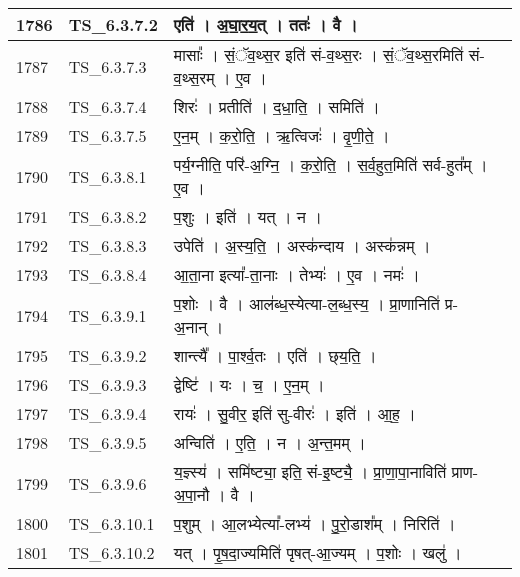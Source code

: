 \documentclass[17pt]{extarticle}
\begin{document}
\begin{longtable}{||p{0.4in}||p{0.9in}||p{4.0in}||p{0.9in}||}
        \hline
            1786 & TS\_6.3.7.2 & एति॑   ।   अ॒घा॒र॒य॒त्   ।   ततः॑   ।   वै   ।    &      \\
        \hline
            1787 & TS\_6.3.7.3 & मासाः᳚   ।   सं॒ॅव॒थ्स॒र इति॑ सं{-}व॒थ्स॒रः   ।   सं॒ॅव॒थ्स॒रमिति॑ सं{-}व॒थ्स॒रम्   ।   ए॒व   ।    &      \\
        \hline
            1788 & TS\_6.3.7.4 & शिरः॑   ।   प्रतीति॑   ।   द॒धा॒ति॒   ।   समिति॑   ।    &      \\
        \hline
            1789 & TS\_6.3.7.5 & ए॒न॒म्   ।   क॒रो॒ति॒   ।   ऋ॒त्विजः॑   ।   वृ॒णी॒ते॒   ।    &      \\
        \hline
            1790 & TS\_6.3.8.1 & पर्य॒ग्नीति॒ परि॑{-}अ॒ग्नि॒   ।   क॒रो॒ति॒   ।   स॒र्व॒हुत॒मिति॑ सर्व{-}हुत᳚म्   ।   ए॒व   ।    &      \\
        \hline
            1791 & TS\_6.3.8.2 & प॒शुः   ।   इति॑   ।   यत्   ।   न   ।    &      \\
        \hline
            1792 & TS\_6.3.8.3 & उपेति॑   ।   अ॒स्य॒ति॒   ।   अस्क॑न्दाय   ।   अस्क॑न्नम्   ।    &      \\
        \hline
            1793 & TS\_6.3.8.4 & आ॒ता॒ना इत्या᳚{-}ता॒नाः   ।   तेभ्यः॑   ।   ए॒व   ।   नमः॑   ।    &      \\
        \hline
            1794 & TS\_6.3.9.1 & प॒शोः   ।   वै   ।   आल॑ब्ध॒स्येत्या{-}ल॒ब्ध॒स्य॒   ।   प्रा॒णानिति॑ प्र{-}अ॒नान्   ।    &      \\
        \hline
            1795 & TS\_6.3.9.2 & शान्त्यै᳚   ।   पा॒र्श्व॒तः   ।   एति॑   ।   छ्‌य॒ति॒   ।    &      \\
        \hline
            1796 & TS\_6.3.9.3 & द्वेष्टि॑   ।   यः   ।   च॒   ।   ए॒न॒म्   ।    &      \\
        \hline
            1797 & TS\_6.3.9.4 & रायः॑   ।   सु॒वीर॒ इति॑ सु{-}वीरः॑   ।   इति॑   ।   आ॒ह॒   ।    &      \\
        \hline
            1798 & TS\_6.3.9.5 & अन्विति॑   ।   ए॒ति॒   ।   न   ।   अ॒न्त॒मम्   ।    &      \\
        \hline
            1799 & TS\_6.3.9.6 & य॒ज्ञ्स्य॑   ।   समि॑ष्ट्या॒ इति॒ सं{-}इ॒ष्ट्यै॒   ।   प्रा॒णा॒पा॒नाविति॑ प्राण{-}अ॒पा॒नौ   ।   वै   ।    &      \\
        \hline
            1800 & TS\_6.3.10.1 & प॒शुम्   ।   आ॒लभ्येत्या᳚{-}लभ्य॑   ।   पु॒रो॒डाश᳚म्   ।   निरिति॑   ।    &      \\
        \hline
            1801 & TS\_6.3.10.2 & यत्   ।   पृ॒ष॒दा॒ज्यमिति॑ पृषत्{-}आ॒ज्यम्   ।   प॒शोः   ।   खलु॑   ।    &      \\

\end{longtable}
\end{document}
